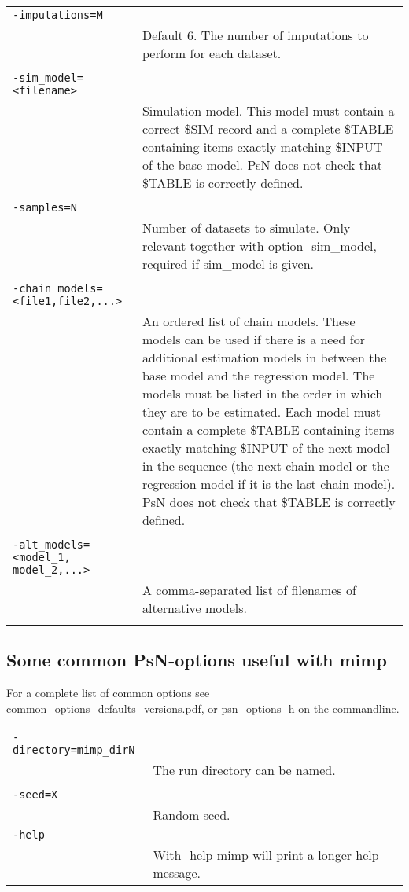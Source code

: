 \documentclass[a4paper,12pt]{article}
\begin{document}
\begin{longtable}{p{1in}p{4in}}
\verb|-imputations=M| & \\
\nopagebreak
 & Default 6. The number of imputations to perform for each dataset. \\
\\
\verb|-sim_model=<filename>| & \\
\nopagebreak
 & Simulation model. This model must contain a correct \$SIM record and a complete \$TABLE containing items exactly matching \$INPUT of the base model. PsN does not check that \$TABLE is correctly defined. \\
\\
\verb|-samples=N| & \\
\nopagebreak
 & Number of datasets to simulate. Only relevant together with option -sim\_model, required if sim\_model is given. \\
\\
\verb|-chain_models= <file1,file2,...>| & \\
\nopagebreak
 & An ordered list of chain models. These models can be used if there is a need for additional estimation models in between the base model and the regression model. The models must be listed in the order in which they are to be estimated. Each model must contain a complete \$TABLE containing items exactly matching \$INPUT of the next model in the sequence (the next chain model or the regression model if it is the last chain model). PsN does not check that \$TABLE is correctly defined.   \\
\\
\verb|-alt_models=<model_1, model_2,...>| & \\
\nopagebreak
 & A comma-separated list of filenames of alternative models. \\
\\
\end{longtable}

\subsection{Some common PsN-options useful with mimp}

For a complete list of common options see common\_options\_defaults\_versions.pdf, or psn\_options -h on the commandline.

\begin{longtable}{p{1in}p{4in}}
\verb|-directory=mimp_dirN| & \\
\nopagebreak
 & The run directory can be named. \\
\\
\verb|-seed=X| & \\
\nopagebreak
 & Random seed.
\\
\verb|-help| & \\
\nopagebreak
 & With -help mimp will print a longer help message. \\
\end{longtable}
\end{document}

